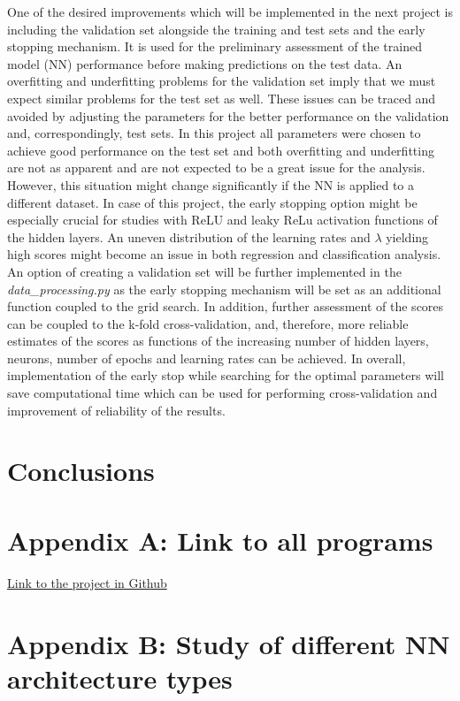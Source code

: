 \documentclass{emulateapj}
\begin{document}
One of the desired improvements which will be implemented in the next project is including the validation set alongside the training and test sets and the early stopping mechanism. It is used for the preliminary assessment of the trained model (NN) performance before making predictions on the test data. An overfitting and underfitting problems for the validation set imply that we must expect similar problems for the test set as well. These issues can be traced and avoided by adjusting the parameters for the better performance on the validation and, correspondingly, test sets. In this project all parameters were chosen to achieve good performance on the test set and both overfitting and underfitting are not as apparent and are not expected to be a great issue for the analysis. However, this situation might change significantly if the NN is applied to a different dataset. In case of this project, the early stopping option might be especially crucial for studies with ReLU and leaky ReLu activation functions of the hidden layers. An uneven distribution of the learning rates and $\lambda$ yielding high scores might become an issue in both regression and classification analysis. An option of creating a validation set will be further implemented in the \textit{data\_processing.py} as the early stopping mechanism will be set as an additional function coupled to the grid search. In addition, further assessment of the scores can be coupled to the k-fold cross-validation, and, therefore, more reliable estimates of the scores as functions of the increasing number of hidden layers, neurons, number of epochs and learning rates can be achieved. In overall, implementation of the early stop while searching for the optimal parameters will save computational time which can be used for performing cross-validation and improvement of reliability of the results.

\section{Conclusions} 
\label{sec: Conclusions}


\section{Appendix A: Link to all programs}
\label{Appendix:A}
\href{https://github.com/tellefs/ML-projects/tree/master/project2}{Link to the project in Github}

\section{Appendix B: Study of different NN architecture types}
\label{Appendix:B}
\end{document}
